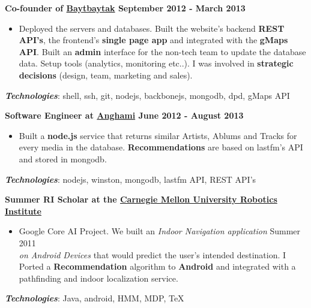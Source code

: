 \documentclass[10pt]{article}
\newenvironment{outerlist}[1][\enskip\textbullet]%
        {\begin{itemize}[#1]}{\end{itemize}%
         \vspace{-.6\baselineskip}}
\begin{document}
\textbf{Co-founder of \href{http://baytbaytak.com}{Baytbaytak} \hfill \small September 2012 - March 2013} 
\begin{outerlist}
\item[] Deployed the servers and databases.
Built the website's backend \textbf{REST API's}, the frontend's \textbf{single page app} and integrated with the \textbf{gMaps API}. 
Built an \textbf{admin} interface for the non-tech team to update the database data. Setup tools (analytics, monitoring etc..).
I was involved in \textbf{strategic decisions} (design, team, marketing and sales).
\end{outerlist}

\vspace{0.2cm}
\hspace{0.25cm}\textbf{\textit{Technologies}}: 
shell, ssh, git, nodejs, backbonejs, mongodb, dpd, gMaps API

\vspace{0.4cm}

\textbf{
  Software Engineer at \href{http://anghami.com/}{Anghami} 
  \hfill \small June 2012 - August 2013
}
\begin{outerlist}
\item[] Built a \textbf{node.js} service that returns similar Artists, 
Ablums and Tracks for every media in the database.
\textbf{Recommendations} are based on lastfm's API and stored in mongodb.
\end{outerlist}

\vspace{0.2cm}
\hspace{0.25cm}\textbf{\textit{Technologies}}: 
nodejs, winston, mongodb, lastfm API, REST API's

\vspace{0.4cm}

\textbf{Summer RI Scholar at the \href{http://www.ri.cmu.edu/}{Carnegie Mellon University Robotics Institute}}
\begin{outerlist}
\item[] Google Core AI Project. We built an \textit{Indoor Navigation application}
\hfill \small Summer 2011 \\
\textit{on Android Devices} that would predict the user's intended destination.
I Ported a \textbf{Recommendation}
algorithm to \textbf{Android} and integrated with a pathfinding and indoor localization service.
\end{outerlist}

\vspace{0.2cm}
\hspace{0.25cm}\textbf{\textit{Technologies}}: 
Java, android, HMM, MDP, \TeX{}
\end{document}
